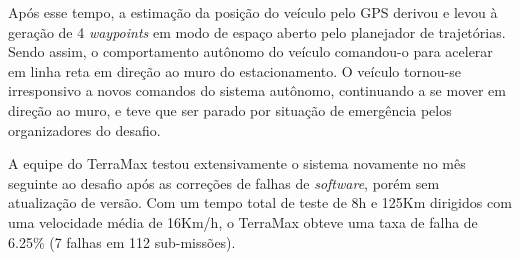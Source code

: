 Após esse tempo, a estimação da posição do veículo pelo GPS derivou e levou à geração de 4 \emph{waypoints} em modo de espaço aberto pelo planejador de trajetórias. Sendo assim, o comportamento autônomo do veículo comandou-o para acelerar em linha reta em direção ao muro do estacionamento. O veículo tornou-se irresponsivo a novos comandos do sistema autônomo, continuando a se mover em direção ao muro, e teve que ser parado por situação de emergência pelos organizadores do desafio.

A equipe do TerraMax testou extensivamente o sistema novamente no mês seguinte ao desafio após as correções de falhas de \emph{software}, porém sem atualização de versão. Com um tempo total de teste de 8h e 125Km dirigidos com uma velocidade média de 16Km/h, o TerraMax obteve uma taxa de falha de 6.25\% (7 falhas em 112 sub-missões).




 